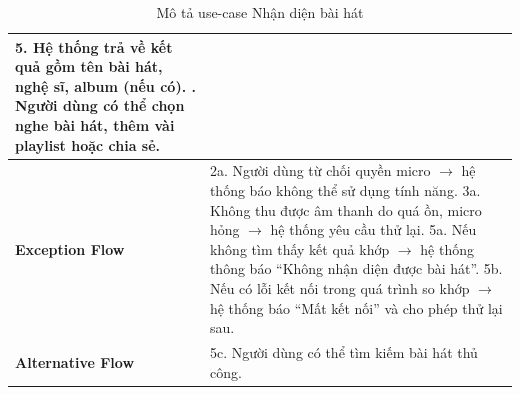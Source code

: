 \documentclass[a4paper]{article}
\begin{document}
\begin{table}[H]
\begin{tabularx}{\textwidth}{|l|X|}
		5. Hệ thống trả về kết quả gồm tên bài hát, nghệ sĩ, album (nếu có). \newline
		6. Người dùng có thể chọn nghe bài hát, thêm vài playlist hoặc chia sẻ.                                                                                                                     \\ \hline
		\textbf{Exception Flow}
		                       & 2a. Người dùng từ chối quyền micro $\rightarrow$ hệ thống báo không thể sử dụng tính năng. \newline
		3a. Không thu được âm thanh do quá ồn, micro hỏng $\rightarrow$ hệ thống yêu cầu thử lại. \newline
		5a. Nếu không tìm thấy kết quả khớp $\rightarrow$ hệ thống thông báo “Không nhận diện được bài hát”. \newline
		5b. Nếu có lỗi kết nối trong quá trình so khớp $\rightarrow$ hệ thống báo “Mất kết nối” và cho phép thử lại sau.                                                                            \\ \hline
		\textbf{Alternative Flow}
		                       & 5c. Người dùng có thể tìm kiếm bài hát thủ công.                                                                                                                   \\ \hline
	\end{tabularx}
	\caption{Mô tả use-case Nhận diện bài hát}
\end{table}

\end{document}

